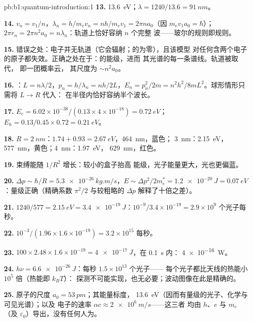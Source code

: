 \begin{solution}{pb:b1:quantum-introduction:1}
\textbf{13.} \qty{13.6}{eV}；$\lambda = 1240/13.6 = \qty{91}{nm}$。

\textbf{14.} $v_n = v_1/n$，$\lambda_n = h/m_ev_n = nh/m_ev_1 = 2\pi na_0$（因 $m_ev_1a_0
= \hbar$）；$2\pi r_n = 2\pi n^2a_0 = n\lambda_n$：轨道上恰好容纳 $n$ 个完整
波——玻尔的规则即规则。

\textbf{15.} 错误之处：电子并无轨道（它会辐射；的为零），且该模型
对任何含两个电子的原子都失效。正确之处在于：的能级，进而
其光谱的每一条谱线。轨道被取代，
即一团概率云，
其尺度为 $\sim n^2a_0$。

\textbf{16.} ：$L = n\lambda/2$，$p_n = h/\lambda_n = nh/2L$，$E_n =
p_n^2/2m = n^2h^2/8mL^2$。球形情形只需将 $L \to R$ 代入：
在半径内恰好容纳半个波长。

\textbf{17.} $E_e = 6.02 \times 10^{-38}/(0.13 \times 4 \times 10^{-18}) = \qty{0.72}{eV}$；
$E_h = 0.13/0.45 \times 0.72 = \qty{0.21}{eV}$。

\textbf{18.} $R = \qty{2}{nm}$：$1.74 + 0.93 = \qty{2.67}{eV}$，\qty{464}{nm}，蓝色；
\qty{3}{nm}：\qty{2.15}{eV}，\qty{577}{nm}，黄色；\qty{4}{nm}：\qty{1.97}{eV}，
\qty{629}{nm}，红色。

\textbf{19.} 束缚能随 $1/R^2$ 增长：较小的盒子抬高
能级，光子能量更大，光也更偏蓝。

\textbf{20.} $\Delta p \sim \hbar/R = \qty{5.3e-26}{kg.m/s}$，$E \sim \Delta p^2/2m_e^\ast =
\qty{1.2e-20}{J} = \qty{0.07}{eV}$：量级正确（精确系数
$\pi^2/2$ 与较粗略的 $\Delta p$ 解释了十倍之差）。

\textbf{21.} $1240/577 = \qty{2.15}{eV} = \qty{3.4e-19}{J}$：$10^{-9}/3.4 \times 10^{-19}
= 2.9 \times 10^9$ 个光子每秒。

\textbf{22.} $10^{-3}/(1.96 \times 1.6 \times 10^{-19}) = 3.2 \times 10^{15}$ 每秒。

\textbf{23.} $100 \times 2.48 \times 1.6 \times 10^{-19} = \qty{4e-17}{J}$，在 \qty{0.1}{s} 内：
\qty{4e-16}{W}。

\textbf{24.} $h\nu = \qty{6.6e-26}{J}$：每秒 $1.5 \times 10^{13}$ 个光子——
每个光子都比天线的热能小 $10^5$ 倍（热能即 $k_BT$）：
探测不可能实现，也无必要；波动图像在此是精确的。

\textbf{25.} 原子的尺度 $a_0 = \qty{53}{pm}$；其能量标度，
\qty{13.6}{eV}（因而有量级的光子、化学与可见光谱）；以及
电子的速率 $\alpha c \approx \qty{2e6}{m/s}$——这三者
均由 $h$、$e$ 与 $m_e$（及 $\varepsilon_0$）导出，没有任何人为。
\end{solution}
